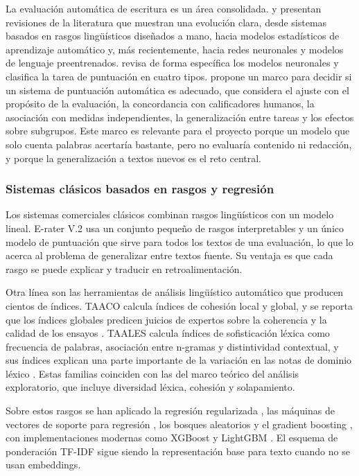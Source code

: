 \documentclass[11pt,a4paper]{article}
\begin{document}
La evaluación automática de escritura es un área consolidada. \citet{hussein2019} y \citet{ramesh2022} presentan revisiones de la literatura que muestran una evolución clara, desde sistemas basados en rasgos lingüísticos diseñados a mano, hacia modelos estadísticos de aprendizaje automático y, más recientemente, hacia redes neuronales y modelos de lenguaje preentrenados. \citet{uto2021} revisa de forma específica los modelos neuronales y clasifica la tarea de puntuación en cuatro tipos. \citet{williamson2012} propone un marco para decidir si un sistema de puntuación automática es adecuado, que considera el ajuste con el propósito de la evaluación, la concordancia con calificadores humanos, la asociación con medidas independientes, la generalización entre tareas y los efectos sobre subgrupos. Este marco es relevante para el proyecto porque un modelo que solo cuenta palabras acertaría bastante, pero no evaluaría contenido ni redacción, y porque la generalización a textos nuevos es el reto central.

\subsubsection{Sistemas clásicos basados en rasgos y regresión}

Los sistemas comerciales clásicos combinan rasgos lingüísticos con un modelo lineal. E-rater V.2 \citep{attali2006} usa un conjunto pequeño de rasgos interpretables y un único modelo de puntuación que sirve para todos los textos de una evaluación, lo que lo acerca al problema de generalizar entre textos fuente. Su ventaja es que cada rasgo se puede explicar y traducir en retroalimentación.

Otra línea son las herramientas de análisis lingüístico automático que producen cientos de índices. TAACO calcula índices de cohesión local y global, y se reporta que los índices globales predicen juicios de expertos sobre la coherencia y la calidad de los ensayos \citep{crossley2016}. TAALES calcula índices de sofisticación léxica como frecuencia de palabras, asociación entre n-gramas y distintividad contextual, y sus índices explican una parte importante de la variación en las notas de dominio léxico \citep{kyle2018}. Estas familias coinciden con las del marco teórico del análisis exploratorio, que incluye diversidad léxica, cohesión y solapamiento.

Sobre estos rasgos se han aplicado la regresión regularizada \citep{hoerl1970}, las máquinas de vectores de soporte para regresión \citep{cortes1995,smola2004}, los bosques aleatorios \citep{breiman2001} y el gradient boosting \citep{friedman2001}, con implementaciones modernas como XGBoost \citep{chen2016} y LightGBM \citep{ke2017}. El esquema de ponderación TF-IDF \citep{salton1988} sigue siendo la representación base para texto cuando no se usan embeddings.
\end{document}
